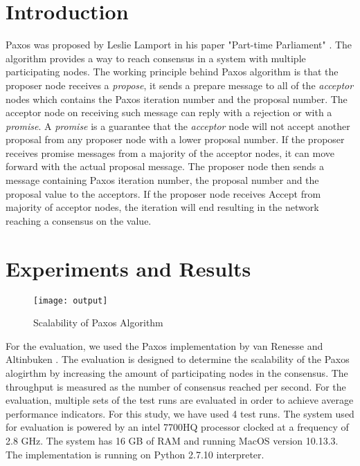 \section{Introduction}
Paxos was proposed by Leslie Lamport in his paper "Part-time Parliament" \cite{lamport1998part}. 
The algorithm provides a way to reach consensus in a system with multiple participating nodes. 
The working principle behind Paxos algorithm is that the proposer node receives a \textit{propose}, it sends a prepare message to all of the \textit{acceptor} nodes which contains the Paxos iteration number and the proposal number. 
The acceptor node on receiving such message can reply with a rejection or with a \textit{promise}. 
A \textit{promise} is a guarantee that the \textit{acceptor} node will not accept another proposal from any proposer node with a lower proposal number. 
If the proposer receives promise messages from a majority of the acceptor nodes, it can move forward with the actual proposal message. 
The proposer node then sends a message containing Paxos iteration number, the proposal number and the proposal value to the acceptors. 
If the proposer node receives Accept from majority of acceptor nodes, the iteration will end resulting in the network reaching a consensus on the value. 
\section{Experiments and Results}
\begin{figure}
\label{fig:paxos}
\centering
\vspace*{-3cm}
\texttt{[image: output]} 
\vspace*{-3.5cm}
\caption{Scalability of Paxos Algorithm}
\end{figure}
For the evaluation, we used the Paxos implementation by van Renesse and Altinbuken \cite{van2015paxos}. 
The evaluation is designed to determine the scalability of the Paxos alogirthm by increasing the amount of participating nodes in the consensus. 
The throughput is measured as the number of consensus reached per second. 
For the evaluation, multiple sets of the test runs are evaluated in order to achieve average performance indicators. 
For this study, we have used 4 test runs. 
The system used for evaluation is powered by an intel 7700HQ processor clocked at a frequency of 2.8 GHz. 
The system has 16 GB of RAM and running MacOS version 10.13.3. 
The implementation is running on Python 2.7.10 interpreter. \\

